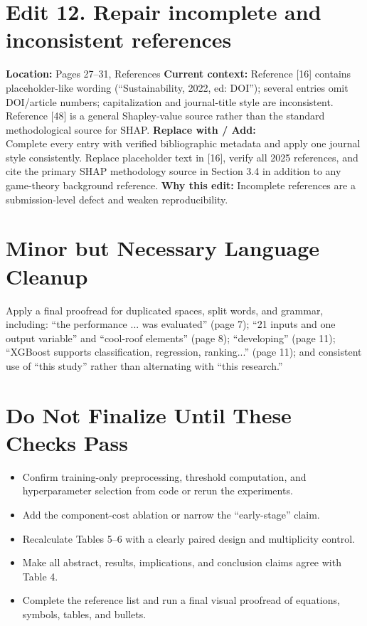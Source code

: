 \documentclass[11pt]{article}
\newcommand{\loc}[1]{\textbf{Location:} #1}
\newcommand{\current}[1]{\textbf{Current context:} #1}
\newcommand{\replacewith}[1]{\textbf{Replace with / Add:}\\{\color{blue}#1}}
\newcommand{\why}[1]{\textbf{Why this edit:} #1}
\begin{document}
\section*{Edit 12. Repair incomplete and inconsistent references}
\loc{Pages 27--31, References}
\current{Reference [16] contains placeholder-like wording (``Sustainability, 2022, ed: DOI''); several entries omit DOI/article numbers; capitalization and journal-title style are inconsistent. Reference [48] is a general Shapley-value source rather than the standard methodological source for SHAP.}
\replacewith{Complete every entry with verified bibliographic metadata and apply one journal style consistently. Replace placeholder text in [16], verify all 2025 references, and cite the primary SHAP methodology source in Section 3.4 in addition to any game-theory background reference.}
\why{Incomplete references are a submission-level defect and weaken reproducibility.}

\section*{Minor but Necessary Language Cleanup}
Apply a final proofread for duplicated spaces, split words, and grammar, including: ``the performance ... was evaluated'' (page 7); ``21 inputs and one output variable'' and ``cool-roof elements'' (page 8); ``developing'' (page 11); ``XGBoost supports classification, regression, ranking...'' (page 11); and consistent use of ``this study'' rather than alternating with ``this research.''

\section*{Do Not Finalize Until These Checks Pass}
\begin{itemize}[leftmargin=*]
\item Confirm training-only preprocessing, threshold computation, and hyperparameter selection from code or rerun the experiments.
\item Add the component-cost ablation or narrow the ``early-stage'' claim.
\item Recalculate Tables 5--6 with a clearly paired design and multiplicity control.
\item Make all abstract, results, implications, and conclusion claims agree with Table 4.
\item Complete the reference list and run a final visual proofread of equations, symbols, tables, and bullets.
\end{itemize}
\end{document}
